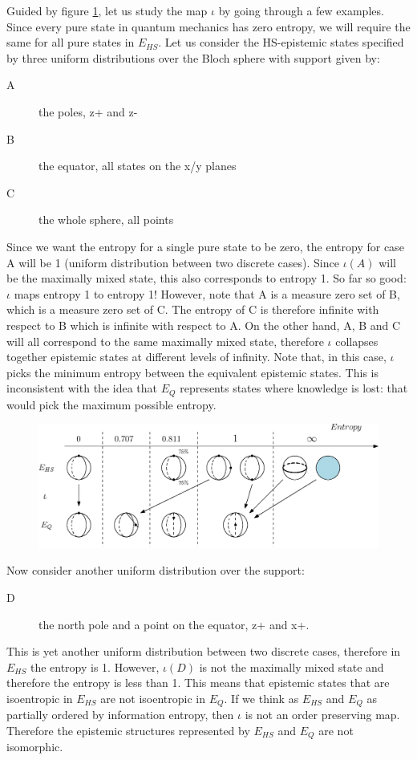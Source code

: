 \documentclass[twocolumn,prl,floatfix,superscriptaddress]{revtex4-2}
\begin{document}
Guided by figure \ref{fig_map}, let us study the map $\iota$ by going through a few examples. Since every pure state in quantum mechanics has zero entropy, we will require the same for all pure states in $E_{HS}$. Let us consider the HS-epistemic states specified by three uniform distributions over the Bloch sphere with support given by:
\begin{description}
	\item[A] the poles, z+ and z-
	\item[B] the equator, all states on the x/y planes
	\item[C] the whole sphere, all points
\end{description}
Since we want the entropy for a single pure state to be zero, the entropy for case A will be 1 (uniform distribution between two discrete cases). Since $\iota(A)$ will be the maximally mixed state, this also corresponds to entropy 1. So far so good: $\iota$ maps entropy 1 to entropy 1! However, note that A is a measure zero set of B, which is a measure zero set of C. The entropy of C is therefore infinite with respect to B which is infinite with respect to A. On the other hand, A, B and C will all correspond to the same maximally mixed state, therefore $\iota$ collapses together epistemic states at different levels of infinity. Note that, in this case, $\iota$ picks the minimum entropy between the equivalent epistemic states. This is inconsistent with the idea that $E_{Q}$ represents states where knowledge is lost: that would pick the maximum possible entropy.

\begin{figure}
\includegraphics[scale=.4]{fig2}
\caption{\footnotesize{}}\label{fig_map}
\end{figure}

Now consider another uniform distribution over the support:
\begin{description}
	\item[D] the north pole and a point on the equator, z+ and x+.
\end{description}
This is yet another uniform distribution between two discrete cases, therefore in $E_{HS}$ the entropy is 1. However, $\iota(D)$ is not the maximally mixed state and therefore the entropy is less than 1. This means that epistemic states that are isoentropic in $E_{HS}$ are not isoentropic in $E_{Q}$. If we think as $E_{HS}$ and $E_{Q}$ as partially ordered by information entropy, then $\iota$ is not an order preserving map. Therefore the epistemic structures represented by $E_{HS}$ and $E_{Q}$ are not isomorphic.
\end{document}
